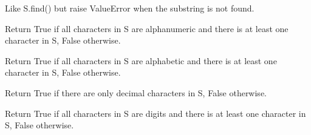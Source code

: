 \documentclass[letterpaper,10pt,english]{sphinxmanual}
\begin{document}
\begin{fulllineitems}
\begin{fulllineitems}
\label{api_reference:textblob_de.blob.Word.index}
Like S.find() but raise ValueError when the substring is not found.

\end{fulllineitems}


\begin{fulllineitems}
\label{api_reference:textblob_de.blob.Word.isalnum}
Return True if all characters in S are alphanumeric
and there is at least one character in S, False otherwise.

\end{fulllineitems}


\begin{fulllineitems}
\label{api_reference:textblob_de.blob.Word.isalpha}
Return True if all characters in S are alphabetic
and there is at least one character in S, False otherwise.

\end{fulllineitems}


\begin{fulllineitems}
\label{api_reference:textblob_de.blob.Word.isdecimal}
Return True if there are only decimal characters in S,
False otherwise.

\end{fulllineitems}


\begin{fulllineitems}
\label{api_reference:textblob_de.blob.Word.isdigit}
Return True if all characters in S are digits
and there is at least one character in S, False otherwise.

\end{fulllineitems}



\end{fulllineitems}
\end{document}
